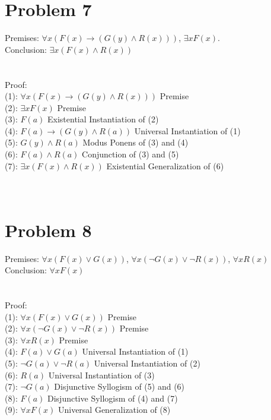 \documentclass{article}
\begin{document}
\section{Problem 7}
Premises: $\forall x (F(x) \rightarrow (G(y) \wedge R(x)))$, $\exists x F(x)$.\\
Conclusion: $\exists x (F(x) \wedge R(x))$\\
\\ \hspace*{\fill} \\
Proof: \\
(1): $\forall x (F(x) \rightarrow (G(y) \wedge R(x)))$ Premise\\
(2): $\exists x F(x)$ Premise\\
(3): $F(a)$ Existential Instantiation of (2)\\
(4): $F(a) \rightarrow (G(y) \wedge R(a))$ Universal Instantiation of (1)\\
(5): $G(y) \wedge R(a)$ Modus Ponens of (3) and (4)\\
(6): $F(a) \wedge R(a)$ Conjunction of (3) and (5)\\
(7): $\exists x (F(x) \wedge R(x))$ Existential Generalization of (6)\\
\\ \hspace*{\fill} \\
\section{Problem 8}
Premises: $\forall x (F(x) \vee G(x))$, $\forall x (\neg G(x) \vee \neg R(x))$, $\forall x R(x)$\\
Conclusion: $\forall x F(x)$\\
\\ \hspace*{\fill} \\
Proof: \\
(1): $\forall x (F(x) \vee G(x))$ Premise\\
(2): $\forall x (\neg G(x) \vee \neg R(x))$ Premise\\
(3): $\forall x R(x)$ Premise\\
(4): $F(a) \vee G(a)$ Universal Instantiation of (1)\\
(5): $\neg G(a) \vee \neg R(a)$ Universal Instantiation of (2)\\
(6): $R(a)$ Universal Instantiation of (3)\\
(7): $\neg G(a)$ Disjunctive Syllogism of (5) and (6)\\
(8): $F(a)$ Disjunctive Syllogism of (4) and (7)\\
(9): $\forall x F(x)$ Universal Generalization of (8)\\
\\ \hspace*{\fill} \\
\end{document}
